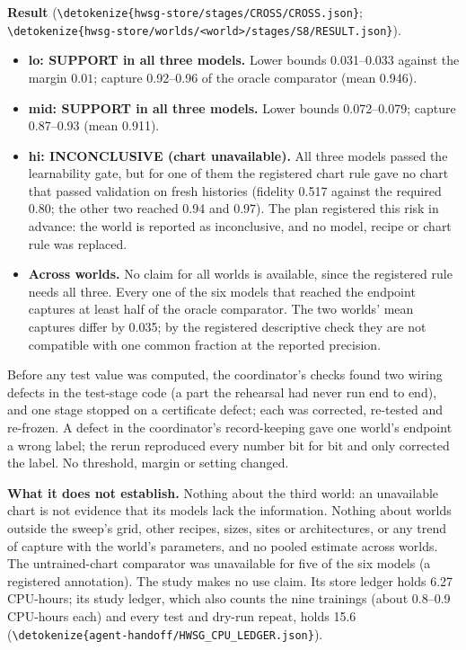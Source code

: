 \documentclass[11pt,a4paper]{article}
\DeclareRobustCommand{\_}{\ifmmode\origunderscore\else\textunderscore\allowbreak\fi}
\DeclareRobustCommand{\fpath}[1]{\begingroup\small\expandafter\nolinkurl\expandafter{\detokenize{#1}}\endgroup}
\begin{document}
\textbf{Result} (\fpath{hwsg-store/stages/CROSS/CROSS.json};
\fpath{hwsg-store/worlds/<world>/stages/S8/RESULT.json}).
\begin{itemize}
\item \textbf{lo: SUPPORT in all three models.} Lower bounds 0.031--0.033 against the margin
$0.01$; capture 0.92--0.96 of the oracle comparator (mean 0.946).
\item \textbf{mid: SUPPORT in all three models.} Lower bounds 0.072--0.079; capture 0.87--0.93
(mean 0.911).
\item \textbf{hi: INCONCLUSIVE (chart unavailable).} All three models passed the learnability gate,
but for one of them the registered chart rule gave no chart that passed validation on fresh
histories (fidelity 0.517 against the required 0.80; the other two reached 0.94 and 0.97). The
plan registered this risk in advance: the world is reported as inconclusive, and no model,
recipe or chart rule was replaced.
\item \textbf{Across worlds.} No claim for all worlds is available, since the registered rule needs
all three. Every one of the six models that reached the endpoint captures at least half of the
oracle comparator. The two worlds' mean captures differ by 0.035; by the registered descriptive
check they are not compatible with one common fraction at the reported precision.
\end{itemize}
Before any test value was computed, the coordinator's checks found two wiring defects in the
test-stage code (a part the rehearsal had never run end to end), and one stage stopped on a
certificate defect; each was corrected, re-tested and re-frozen. A defect in the coordinator's
record-keeping gave one world's endpoint a wrong label; the rerun reproduced every number bit for
bit and only corrected the label. No threshold, margin or setting changed.

\textbf{What it does not establish.} Nothing about the third world: an unavailable chart is not
evidence that its models lack the information. Nothing about worlds outside the sweep's grid,
other recipes, sizes, sites or architectures, or any trend of capture with the world's
parameters, and no pooled estimate across worlds. The untrained-chart comparator was unavailable
for five of the six models (a registered annotation). The study makes no use claim. Its store
ledger holds 6.27 CPU-hours; its study ledger, which also counts the nine trainings (about
0.8--0.9 CPU-hours each) and every test and dry-run repeat, holds 15.6
(\fpath{agent-handoff/HWSG_CPU_LEDGER.json}).
\end{document}
